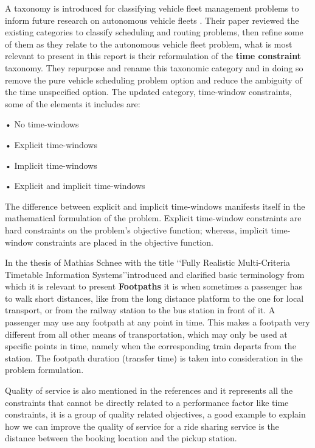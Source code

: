 \documentclass{article}
\begin{document}
A taxonomy is introduced for classifying vehicle fleet management problems to inform future research on autonomous vehicle fleets \cite{hyland_taxonomy}. Their paper reviewed the
existing categories to classify scheduling and routing problems, then refine some of them as they relate to the autonomous vehicle fleet problem, what is most relevant to present in this report is their reformulation of the \textbf{time constraint} taxonomy.
They repurpose and rename this taxonomic category and in doing so remove the pure vehicle scheduling problem option and reduce the ambiguity of the time unspecified option. 
The updated  category, time-window constraints, some of the elements it includes are: 
\begin{list}{}{}
\item • No time-windows
\item • Explicit time-windows
\item • Implicit time-windows
\item • Explicit and implicit time-windows
\end{list}

The difference  between explicit and implicit time-windows manifests itself in the mathematical formulation of the problem. Explicit time-window constraints are hard constraints on the problem’s objective function; whereas, implicit time-window constraints are placed in the objective function.
 

In the thesis of Mathias Schnee with the title \lq\lq{Fully Realistic Multi-Criteria Timetable Information Systems}\rq\rq introduced and clarified basic terminology from which it is relevant to present \textbf{Footpaths} it is when sometimes a passenger has to walk short distances, like from the long distance platform to the one for local transport, or from the railway station to the bus station in front of it. A passenger may use any footpath at any point in time. This makes a footpath very different
from all other means of transportation, which may only be used at specific points in time, namely when the corresponding train departs from the station\cite{Schnee2009}. The footpath duration (transfer time) is taken into consideration in the problem formulation.

Quality of service is also mentioned in the references and it represents all the constraints that cannot be directly related to a performance factor like time constraints, it is a group of quality related objectives, a good example to explain how we can improve the quality of service for a ride sharing service is the distance between the booking location and the pickup station.  
\end{document}
